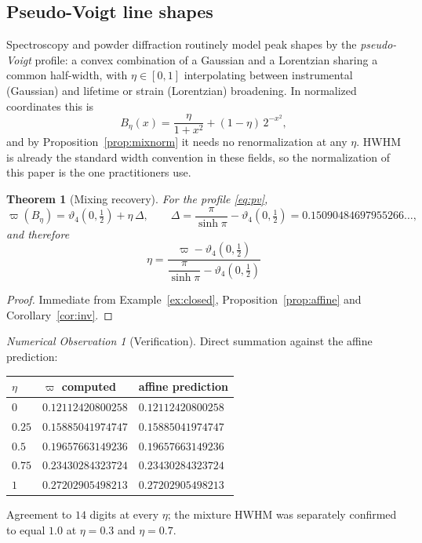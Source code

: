 \documentclass[11pt]{article}
\theoremstyle{definition}
\theoremstyle{plain}
\newtheorem{theorem}[definition]{Theorem}
\theoremstyle{remark}
\newtheorem{observation}[definition]{Numerical Observation}
\begin{document}
\subsection{Pseudo-Voigt line shapes}

Spectroscopy and powder diffraction routinely model peak shapes by the
\emph{pseudo-Voigt} profile: a convex combination of a Gaussian and a Lorentzian sharing
a common half-width, with $\eta\in[0,1]$ interpolating between instrumental (Gaussian)
and lifetime or strain (Lorentzian) broadening. In normalized coordinates this is
\begin{equation}\label{eq:pv}
B_\eta(x)=\frac{\eta}{1+x^2}+(1-\eta)\,2^{-x^2},
\end{equation}
and by Proposition~\ref{prop:mixnorm} it needs no renormalization at any $\eta$. HWHM is
already the standard width convention in these fields, so the normalization of this paper
is the one practitioners use.

\begin{theorem}[Mixing recovery]\label{thm:pv}
For the profile \eqref{eq:pv},
\[
\varpi(B_\eta)=\vartheta_4\!\left(0,\tfrac12\right)+\eta\,\Delta,
\qquad
\Delta=\frac{\pi}{\sinh\pi}-\vartheta_4\!\left(0,\tfrac12\right)
=0.15090484697955266\ldots,
\]
and therefore
\[
\boxed{\;\eta=\frac{\varpi-\vartheta_4\!\left(0,\tfrac12\right)}
{\dfrac{\pi}{\sinh\pi}-\vartheta_4\!\left(0,\tfrac12\right)}\;}
\]
\end{theorem}

\begin{proof}
Immediate from Example~\ref{ex:closed}, Proposition~\ref{prop:affine} and
Corollary~\ref{cor:inv}.
\end{proof}

\begin{observation}[Verification]\label{obs:pv}
Direct summation against the affine prediction:
\begin{center}
\begin{tabular}{@{}lll@{}}
\toprule
$\eta$ & $\varpi$ computed & affine prediction\\
\midrule
$0$    & $0.12112420800258$ & $0.12112420800258$\\
$0.25$ & $0.15885041974747$ & $0.15885041974747$\\
$0.5$  & $0.19657663149236$ & $0.19657663149236$\\
$0.75$ & $0.23430284323724$ & $0.23430284323724$\\
$1$    & $0.27202905498213$ & $0.27202905498213$\\
\bottomrule
\end{tabular}
\end{center}
Agreement to $14$ digits at every $\eta$; the mixture HWHM was separately confirmed to
equal $1.0$ at $\eta=0.3$ and $\eta=0.7$.
\end{observation}
\end{document}
